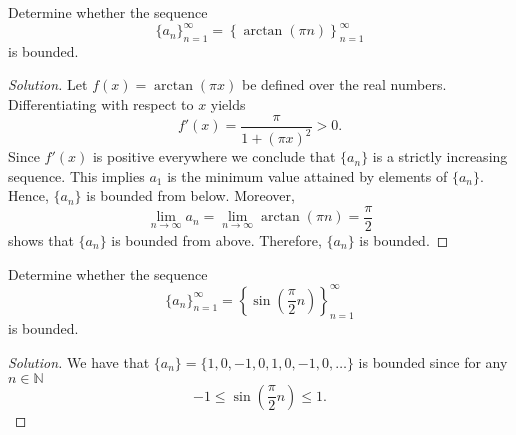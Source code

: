 \documentclass[compacto,10pt,comentarios]{aleph-notas}
\begin{document}
\begin{ejer}
    Determine whether the sequence
    $$
        \{a_n\}_{n=1}^{\infty} = \left\{ \arctan(\pi n)\right\}_{n=1}^{\infty}
    $$
    is bounded.
\end{ejer}
\begin{proof}[Solution]
    Let $f(x) = \arctan(\pi x)$ be defined over the real numbers. Differentiating with respect to $x$ yields
    $$
        f'(x) = \frac{\pi}{1+(\pi x)^2} > 0.
    $$
    Since $f'(x)$ is positive everywhere we conclude that $\{a_n\}$ is a strictly increasing sequence. This implies $a_1$ is the minimum value attained by elements of $\{a_n\}$. Hence, $\{a_n\}$ is bounded from below. Moreover,
    $$
        \lim_{n \to \infty} a_n = \lim_{n \to \infty} \arctan(\pi n) = \frac{\pi}{2}
    $$
    shows that $\{ a_n\}$ is bounded from above. Therefore, $\{a_n\}$ is bounded.
\end{proof}

\begin{ejer}
    Determine whether the sequence
    $$
        \{a_n\}_{n=1}^{\infty} = \left\{ \sin\left( \frac{\pi}{2} n \right) \right\}_{n=1}^{\infty}
    $$
    is bounded.
\end{ejer}
\begin{proof}[Solution]
    We have that $\{ a_n \} = \{1, 0, -1, 0, 1, 0, -1, 0, \ldots \}$ is bounded since for any $n \in \mathbb{N}$
    $$
        -1 \leq \sin\left(\frac{\pi}{2}n \right) \leq 1.
    $$ 
\end{proof}
\end{document}
